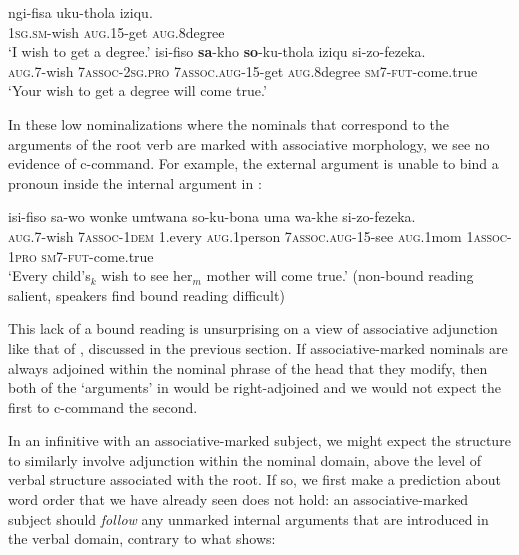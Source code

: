 \documentclass[output=paper,colorlinks,citecolor=brown]{langscibook}
\begin{document}
\ea%
    \label{ex:halpert:14}
    \ea%
    \label{ex:halpert:14a}
    \gll    ngi-fisa uku-thola iziqu.\\
            1\textsc{sg}.\textsc{sm}-wish \textsc{aug}.15-get \textsc{aug}.8degree\\
    \glt    `I wish to get a degree.' 
    \ex%
    \label{ex:halpert:14b}
    \gll    isi-fiso \textbf{sa}-kho \textbf{so}-ku-thola iziqu si-zo-fezeka.\\
            \textsc{aug}.7-wish 7\textsc{assoc}-2\textsc{sg}.\textsc{pro} 7\textsc{assoc}.\textsc{aug}-15-get \textsc{aug}.8degree \textsc{sm}7-\textsc{fut}-come.true\\
    \glt    `Your wish to get a degree will come true.'
    \z 
\z 

In these low nominalizations where the nominals that correspond to the arguments of the root verb are marked with associative morphology, we see no evidence of c-command. For example, the external argument is unable to bind a pronoun inside the internal argument in :

\ea%
    \label{ex:halpert:15}
    \gll    isi-fiso sa-wo wonke umtwana so-ku-bona uma wa-khe si-zo-fezeka.\\
            \textsc{aug}.7-wish 7\textsc{assoc}-1\textsc{dem} 1.every \textsc{aug}.1person 7\textsc{assoc}.\textsc{aug}-15-see \textsc{aug}.1mom 1\textsc{assoc}-1\textsc{pro} \textsc{sm}7-\textsc{fut}-come.true\\
    \glt    `Every child's$_k$ wish to see her$_m$ mother will come true.' (non-bound reading salient, speakers find bound reading difficult)
\z 

This lack of a bound reading is unsurprising on a view of associative adjunction like that of \citet{Pietraszko2019}, discussed in the previous section. If associative-marked nominals are always adjoined within the nominal phrase of the head that they modify, then both of the `arguments' in  would be right-adjoined and we would not expect the first to c-command the second.  

In an infinitive with an associative-marked subject, we might expect the structure to similarly involve adjunction within the nominal domain, above the level of verbal structure associated with the root.  If so, we first make a prediction about word order that we have already seen does not hold: an associative-marked subject should \textit{follow} any unmarked internal arguments that are introduced in the verbal domain, contrary to what  shows:
\end{document}
